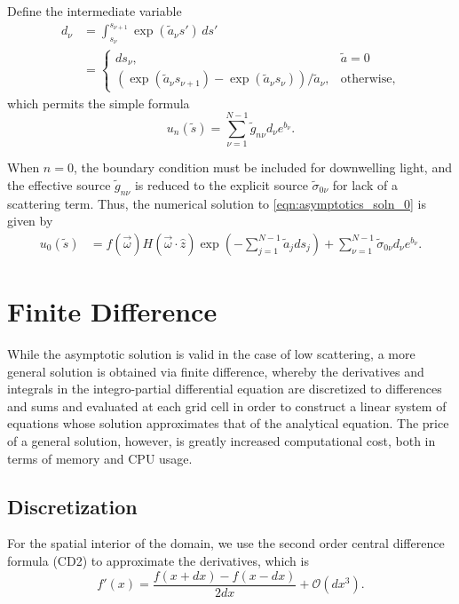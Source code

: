 Define the intermediate variable
\begin{align*}
  d_\nu &= \int_{s_\nu}^{s_{\nu+1}}  \exp\left(\tilde{a}_{\nu}s'\right)\, ds' \\
    &= \begin{cases}
    ds_\nu, & \tilde{a} = 0 \\
      \left( \exp(\tilde{a}_\nu s_{\nu+1}) - \exp(\tilde{a}_\nu s_\nu) \right)/\tilde{a}_\nu, & \mbox{otherwise},
    \end{cases}
\end{align*}
which permits the simple formula
\begin{equation}
  u_n(\tilde{s}) = \sum_{\nu=1}^{N-1} \tilde{g}_{n\nu}d_\nu e^{b_\nu}.
  \label{eqn:discrete_ray_integral}
\end{equation}

When $n=0$, the boundary condition must be included for downwelling light,
and the effective source $\tilde{g}_{n\nu}$ is reduced to the explicit source $\tilde{\sigma}_{0\nu}$
for lack of a scattering term.
Thus, the numerical solution to \eqref{eqn:asymptotics_soln_0} is given by
\begin{align}
  u_0(\tilde{s}) &= f(\vec{\omega})H(\vec{\omega}\cdot\hat{z}) \exp\left( -\sum_{j=1}^{N-1}\tilde{a}_jds_j\right)
  + \sum_{\nu=1}^{N-1} \tilde{\sigma}_{0\nu}d_\nu e^{b_\nu}.
\end{align}

\section{Finite Difference}
While the asymptotic solution is valid in the case of low scattering, a more general solution is obtained via finite difference, whereby the derivatives and integrals in the integro-partial differential equation are discretized to differences and sums and evaluated at each grid cell in order to construct a linear system of equations whose solution approximates that of the analytical equation.
The price of a general solution, however, is greatly increased computational cost, both in terms of memory and CPU usage.

\subsection{Discretization}

For the spatial interior of the domain, we use the second order central difference formula (CD2) to approximate the derivatives, which is
\begin{equation*}
    f'(x) = \frac{f(x+dx)-f(x-dx)}{2dx} + \mathcal{O}(dx^3).
\end{equation*}


